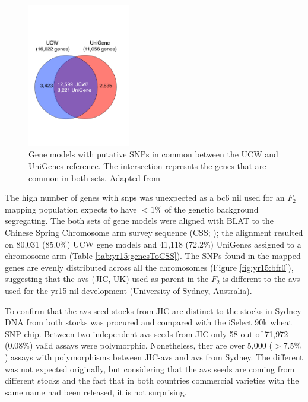\begin{figure}
    \includegraphics[width=0.4\textwidth]{Yr15/Figures/geneCounts.pdf} 
    \caption{Gene models with putative SNPs in common between the UCW and UniGenes reference. The intersection represnts the genes that are common in both sets. Adapted from \citet{Ramirez-Gonzalez2015b}}
    \label{fig:yr15:geneCount}
\end{figure}



The high number of genes with \acrshort{snp}s was unexpected as a \acrshort{bc}6 \acrshort{nil} used for an $F_2$ mapping population expects to have $<1\%$ of the genetic background segregating. 
The both sets of gene models were aligned with BLAT \citep{Kent2002} to the Chinese Spring Chromosome arm survey sequence (CSS; \citealt{Mayer2014}); the alignment resulted on 80,031 (85.0\%) UCW gene models and 41,118 (72.2\%) UniGenes assigned to a chromosome arm (Table \ref{tab:yr15:genesToCSS}). 
The SNPs found in the mapped genes are evenly distributed across all the chromosomes (Figure \ref{fig:yr15:bfr0}), suggesting that the \acrlong{avs} (JIC, UK) used as parent in the $F_{2}$ is different to the \acrlong{avs} used for the \acrshort{yr15} \acrshort{nil} development (University of Sydney, Australia).  

To confirm that the \acrlong{avs} seed stocks from JIC are distinct to the stocks in Sydney  DNA from both stocks was procured and compared with the iSelect 90k wheat SNP chip. 
Between two independent \acrlong{avs} seeds from JIC only 58 out of 71,972 (0.08\%) valid assays were polymorphic. 
Nonetheless, ther are over 5,000 ($>7.5\%$) assays with polymorphisms between  JIC-\acrlong{avs} and \acrlong{avs} from Sydney. 
The different was not expected originally, but considering that the \acrlong{avs} seeds are coming from different stocks and the fact that in both countries commercial varieties with the same name had been released, it is not surprising. 


